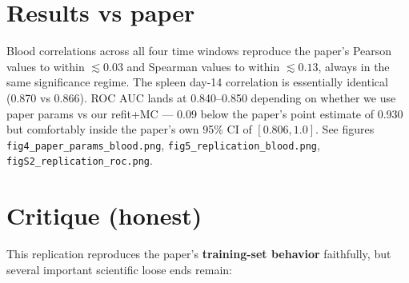 \documentclass[11pt]{article}
\begin{document}
\section{Results vs paper}
Blood correlations across all four time windows reproduce the paper's
Pearson values to within $\lesssim 0.03$ and Spearman values to within
$\lesssim 0.13$, always in the same significance regime. The spleen
day-14 correlation is essentially identical (0.870 vs 0.866). ROC AUC
lands at 0.840--0.850 depending on whether we use paper params vs our
refit+MC — 0.09 below the paper's point estimate of 0.930 but comfortably
inside the paper's own 95\% CI of $[0.806, 1.0]$. See figures
\texttt{fig4\_paper\_params\_blood.png}, \texttt{fig5\_replication\_blood.png},
\texttt{figS2\_replication\_roc.png}.

\section{Critique (honest)}
\label{sec:critique}
This replication reproduces the paper's \textbf{training-set behavior}
faithfully, but several important scientific loose ends remain:
\end{document}
